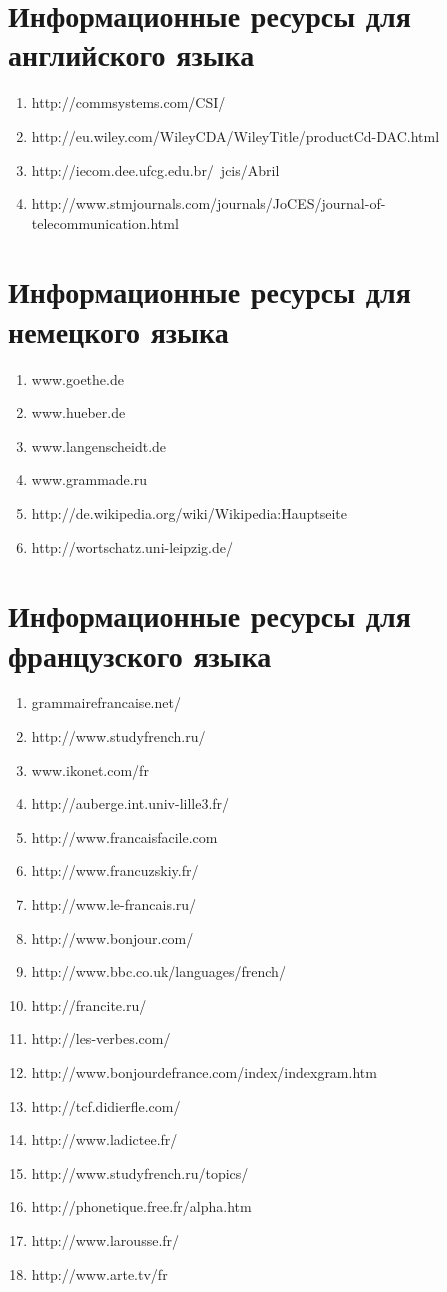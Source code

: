 \section{Информационные ресурсы для английского языка}
\begin{enumerate}
\item http://commsystems.com/CSI/
\item http://eu.wiley.com/WileyCDA/WileyTitle/productCd-DAC.html
\item http://iecom.dee.ufcg.edu.br/~jcis/Abril%
\item http://www.stmjournals.com/journals/JoCES/journal-of-telecommunication.html
\end{enumerate}
\section{Информационные ресурсы для немецкого языка}
\begin{enumerate}
\item www.goethe.de
\item www.hueber.de
\item www.langenscheidt.de
\item www.grammade.ru
\item http://de.wikipedia.org/wiki/Wikipedia:Hauptseite
\item http://wortschatz.uni-leipzig.de/
\end{enumerate}
\section{Информационные ресурсы для французского языка}
\begin{enumerate}
\item grammairefrancaise.net/
\item http://www.studyfrench.ru/
\item www.ikonet.com/fr
\item http://auberge.int.univ-lille3.fr/
\item http://www.francaisfacile.com
\item http://www.francuzskiy.fr/
\item http://www.le-francais.ru/
\item http://www.bonjour.com/
\item http://www.bbc.co.uk/languages/french/
\item http://francite.ru/
\item http://les-verbes.com/
\item http://www.bonjourdefrance.com/index/indexgram.htm
\item http://tcf.didierfle.com/
\item http://www.ladictee.fr/
\item http://www.studyfrench.ru/topics/
\item http://phonetique.free.fr/alpha.htm
\item http://www.larousse.fr/
\item http://www.arte.tv/fr
\end{enumerate}


